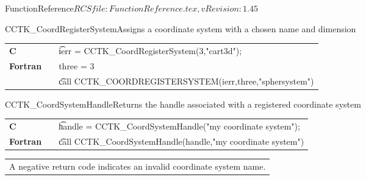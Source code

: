 \begin{cactuspart}{5}{FunctionReference}{$RCSfile: FunctionReference.tex,v $}{$Revision: 1.45 $}
\begin{CCTKFunc}{CCTK\_CoordRegisterSystem}{Assigns a coordinate system with
a chosen name and dimension}
\label{CCTK-CoordRegisterSystem}
\showargs
\begin{params}
\end{params}
\begin{discussion}
\end{discussion}
\begin{examples}
\begin{tabular}{@{}p{3cm}cp{11cm}}
\hfill {\bf C} && {\t ierr = CCTK\_CoordRegisterSystem(3,"cart3d")};
\\
\hfill {\bf Fortran} && three = 3
\\
&&{\t call CCTK\_COORDREGISTERSYSTEM(ierr,three,"sphersystem")}
\\
\end{tabular}
\end{examples}
\begin{errorcodes}
\end{errorcodes}
\end{CCTKFunc}

\begin{CCTKFunc}{CCTK\_CoordSystemHandle}{Returns the handle associated with a registered coordinate system}
\label{CCTK-CoordSystemHandle}
\showargs
\begin{params}
\end{params}
\begin{discussion}
\end{discussion}
\begin{examples}
\begin{tabular}{@{}p{3cm}cp{11cm}}
\hfill {\bf C} && {\t handle =  CCTK\_CoordSystemHandle("my coordinate system");}
\\
\hfill {\bf Fortran} && {\t call CCTK\_CoordSystemHandle(handle,"my coordinate system")}
\\
\end{tabular}
\end{examples}
\begin{errorcodes}
\begin{tabular}{l}
A negative return code indicates an invalid coordinate system name.
\end{tabular}
\end{errorcodes}
\end{CCTKFunc}


\end{cactuspart}
